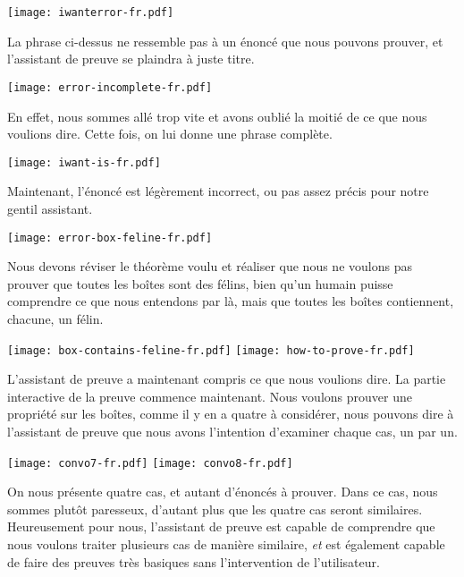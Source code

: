 \begin{center}
  \texttt{[image: iwanterror-fr.pdf]}
\end{center}

La phrase ci-dessus ne ressemble pas à un énoncé que nous pouvons prouver, et
l'assistant de preuve se plaindra à juste titre.

\begin{center}
  \texttt{[image: error-incomplete-fr.pdf]}
\end{center}

En effet, nous sommes allé trop vite et avons oublié la moitié de ce que nous voulions dire. Cette fois, on lui donne une phrase complète.

\begin{center}
  \texttt{[image: iwant-is-fr.pdf]}
\end{center}

Maintenant, l'énoncé est légèrement incorrect, ou pas assez précis pour notre
gentil assistant.

\begin{center}
  \texttt{[image: error-box-feline-fr.pdf]}
\end{center}

Nous devons réviser le théorème voulu et réaliser que nous ne voulons pas
prouver que toutes les boîtes sont des félins, bien qu'un humain puisse
comprendre ce que nous entendons par là, mais que toutes les boîtes
contiennent, chacune, un félin.

\begin{center}
  \texttt{[image: box-contains-feline-fr.pdf]}
  \texttt{[image: how-to-prove-fr.pdf]}
\end{center}

L'assistant de preuve a maintenant compris ce que nous voulions dire. La partie
interactive de la preuve commence maintenant. Nous voulons prouver une propriété
sur les boîtes, comme il y en a quatre à considérer, nous pouvons dire à
l'assistant de preuve que nous avons l'intention d'examiner chaque cas, un par
un.

\begin{center}
  \texttt{[image: convo7-fr.pdf]}
  \texttt{[image: convo8-fr.pdf]}
\end{center}

On nous présente quatre cas, et autant d'énoncés à prouver.
Dans ce cas, nous sommes plutôt paresseux, d'autant plus que les quatre cas
seront similaires. Heureusement pour nous, l'assistant de preuve est capable de
comprendre que nous voulons traiter plusieurs cas de manière similaire,
\emph{et} est également capable de faire des preuves très basiques sans
l'intervention de l'utilisateur.

